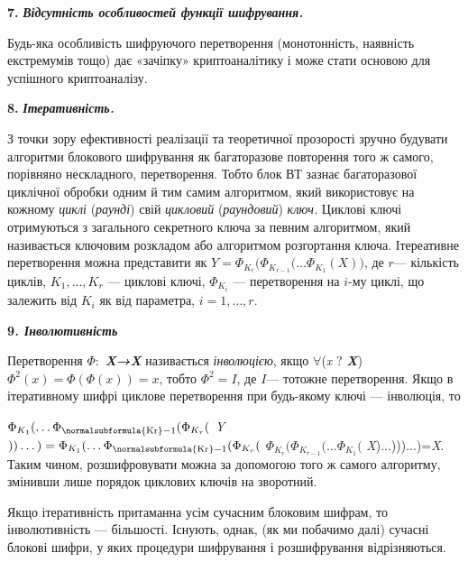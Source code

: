 \bigskip

\textbf{7.}\textit{  }\textbf{\textit{Відсутність особливостей функції
шифрування.}}

Будь-яка особливість шифруючого перетворення (монотонність, наявність
екстремумів тощо) дає «зачіпку» криптоаналітику і може стати основою для
успішного криптоаналізу.


\bigskip

\textbf{8.}\textit{ }\textbf{\textit{ Ітеративність.}}

З точки зору ефективності реалізації та теоретичної прозорості зручно будувати
алгоритми блокового шифрування як багаторазове повторення того ж самого,
порівняно нескладного, перетворення. Тобто блок ВТ зазнає багаторазової
циклічної обробки одним й тим самим алгоритмом, який використовує на кожному
\textit{циклі} (\textit{раунді}) свій \textit{цикловий }(\textit{раундовий})
\textit{ключ.} Циклові ключі отримуються з загального секретного ключа за
певним алгоритмом, який називається ключовим розкладом або алгоритмом
розгортання ключа. Ітереативне перетворення можна представити як   ${Y=\Phi
_{{K_{{r}}}}(\Phi _{K_{{r-1}}}{(\dots\Phi
_{K_{{1}}}}{(X))}}$, де  ${r}$--- кількість циклів, 
${K_{{1}},\dots,K_{{r}}}$ --- циклові ключі,  ${\Phi
_{{K_{{i}}}}}$ $ $--- перетворення на  ${i}${}-му циклі,  що залежить від 
${K_{{i}}}$ як від параметра,  ${i=1,\dots,r}$.


\bigskip

{\bfseries
9\textit{.  Інволютивність }}

Перетворення  ${\Phi :}$
\textbf{\textit{X}}\textbf{\textit{→}}\textbf{\textit{X}}\textbf{\textit{
}}називається \textit{інволюцією}, якщо  ${\forall }$(\textit{x} ${?}$
\textbf{\textit{X}})\textbf{\textit{ }} ${\Phi ^{{2}}(x)=\Phi (\Phi (x))=x}$,
тобто  ${\Phi ^{{2}}=I}$, де  ${I}$--- тотожне перетворення. Якщо в ітеративному
шифрі циклове перетворення при будь-якому ключі --- інволюція, то 

 ${\Phi _{{K_{{1}}}}(\dots\Phi
_{\normalsubformula{\text{Kr}}-1}{(\Phi _{K_{{r}}}}{(}}$ \textit{Y}
${))\dots)=\Phi _{{K_{{1}}}}(\dots\Phi
_{\normalsubformula{\text{Kr}}-1}{(\Phi _{K_{{r}}}}{(}}$  ${\Phi
_{{K_{{r}}}}(\Phi _{K_{{r-1}}}{(\dots\Phi _{K_{{1}}}}{(}}$
\textit{X})...)))...)=\textit{X}. Таким чином, розшифровувати можна за
допомогою того ж самого алгоритму, змінивши лише порядок циклових ключів на
зворотний.

Якщо ітеративність притаманна усім сучасним блоковим шифрам, то інволютивність ---
більшості. Існують, однак, (як ми побачимо далі) сучасні блокові шифри, у яких
процедури шифрування  і розшифрування  відрізняються.


